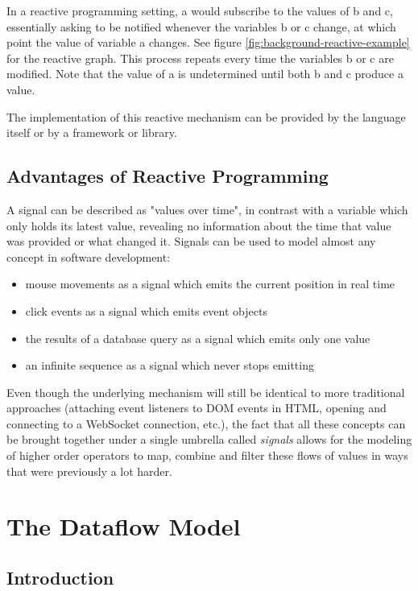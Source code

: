 In a reactive programming setting, a would subscribe to the values of b and c, essentially asking to be notified whenever the variables b or c change, at which point the value of variable a changes. See figure \ref{fig:background-reactive-example} for the reactive graph. This process repeats every time the variables b or c are modified. Note that the value of a is undetermined until both b and c produce a value. 

The implementation of this reactive mechanism can be provided by the language itself or by a framework or library. 

\subsection{Advantages of Reactive Programming}

A signal can be described as "values over time", in contrast with a variable which only holds its latest value, revealing no information about the time that value was provided or what changed it. 
Signals can be used to model almost any concept in software development:
\begin{itemize}
	\item mouse movements as a signal which emits the current position in real time
	\item click events as a signal which emits event objects
	\item the results of a database query as a signal which emits only one value
    \item an infinite sequence as a signal which never stops emitting
\end{itemize}

Even though the underlying mechanism will still be identical to more traditional approaches (attaching event listeners to DOM events in HTML, opening and connecting to a WebSocket connection, etc.), the fact that all these concepts can be brought together under a single umbrella called \textit{signals} allows for the modeling of higher order operators to map, combine and filter these flows of values in ways that were previously a lot harder.

\section{The Dataflow Model}

\subsection{Introduction}

